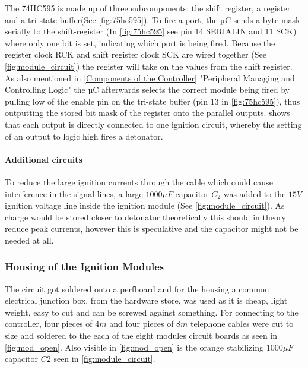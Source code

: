\noindent The 74HC595 is made up of three subcomponents: the shift register, a register and a tri-state buffer(See \cref{fig:75hc595}). To fire a port, the µC sends a byte mask serially to the shift-register (In \cref{fig:75hc595} see pin 14 SERIALIN and 11 SCK) where only one bit is set, indicating which port is being fired. Because the register clock RCK and shift register clock SCK are wired together (See \cref{fig:module_circuit}) the register will take on the values from the shift register. As also mentioned in \cref{Components of the Controller} "Peripheral Managing and Controlling Logic" the µC afterwards selects the correct module being fired by pulling low of the enable pin on the tri-state buffer (pin 13 in \cref{fig:75hc595}), thus outputting the stored bit mask of the register onto the parallel outputs.  shows that each output is directly connected to one ignition circuit, whereby the setting of an output to logic high fires a detonator.\\

\paragraph{Additional circuits}
To reduce the large ignition currents through the cable which could cause interference in the signal lines, a large $1000 \mu F$ capacitor $C_2$ was added to the $15V$ ignition voltage line inside the ignition module (See \cref{fig:module_circuit}). As charge would be stored closer to detonator theoretically this should in theory reduce peak currents, however this is speculative and the capacitor might not be needed at all.\\

\pagebreak

\subsubsection{Housing of the Ignition Modules}

\noindent The circuit got soldered onto a perfboard and for the housing a common electrical junction box, from the hardware store, was used as it is cheap, light weight, easy to cut and can be screwed against something. For connecting to the controller, four pieces of $4m$ and four pieces of $8m$ telephone cables were cut to size and soldered to the each of the eight modules circuit boards as seen in \cref{fig:mod_open}. Also visible in \cref{fig:mod_open} is the orange stabilizing $1000 \mu F$ capacitor $C2$ seen in \cref{fig:module_circuit}.

